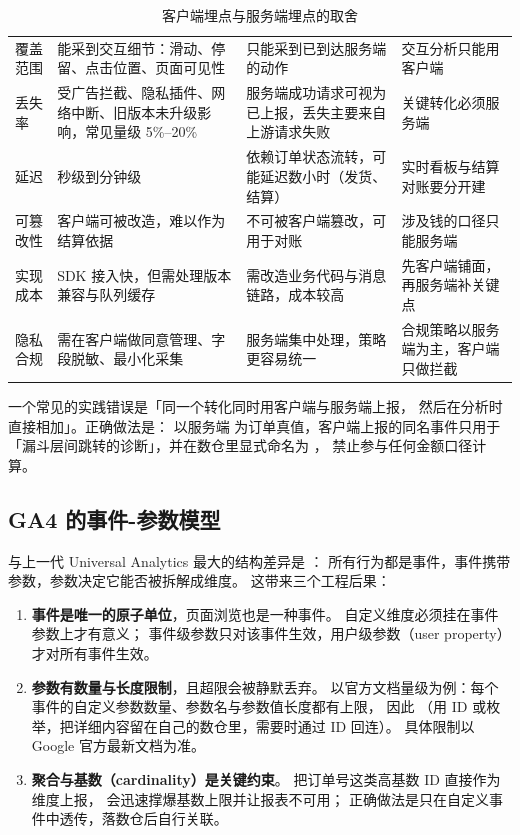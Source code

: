 \begin{table}[htbp]
\centering
\caption{客户端埋点与服务端埋点的取舍}
\label{tab:growth-client-server}
\small
\begin{tabularx}{\textwidth}{L{2.2cm} L{3.4cm} L{3.4cm} Y}
\toprule
{} &  &  &  \\
\midrule
覆盖范围 & 能采到交互细节：滑动、停留、点击位置、页面可见性 & 只能采到已到达服务端的动作 & 交互分析只能用客户端 \\
\addlinespace
丢失率 & 受广告拦截、隐私插件、网络中断、旧版本未升级影响，常见量级 5\%--20\% & 服务端成功请求可视为已上报，丢失主要来自上游请求失败 & 关键转化必须服务端 \\
\addlinespace
延迟 & 秒级到分钟级 & 依赖订单状态流转，可能延迟数小时（发货、结算） & 实时看板与结算对账要分开建 \\
\addlinespace
可篡改性 & 客户端可被改造，难以作为结算依据 & 不可被客户端篡改，可用于对账 & 涉及钱的口径只能服务端 \\
\addlinespace
实现成本 & SDK 接入快，但需处理版本兼容与队列缓存 & 需改造业务代码与消息链路，成本较高 & 先客户端铺面，再服务端补关键点 \\
\addlinespace
隐私合规 & 需在客户端做同意管理、字段脱敏、最小化采集 & 服务端集中处理，策略更容易统一 & 合规策略以服务端为主，客户端只做拦截 \\
\bottomrule
\end{tabularx}
\end{table}

一个常见的实践错误是「同一个转化同时用客户端与服务端上报，
然后在分析时直接相加」。正确做法是：
以服务端  为订单真值，客户端上报的同名事件只用于
「漏斗层间跳转的诊断」，并在数仓里显式命名为 ，
禁止参与任何金额口径计算。

\subsection{GA4 的事件-参数模型}

 与上一代 Universal Analytics 最大的结构差异是
：
所有行为都是事件，事件携带参数，参数决定它能否被拆解成维度。
这带来三个工程后果：

\begin{enumerate}
  \item \textbf{事件是唯一的原子单位}，页面浏览也是一种事件。
        自定义维度必须挂在事件参数上才有意义；
        事件级参数只对该事件生效，用户级参数（user property）才对所有事件生效。
  \item \textbf{参数有数量与长度限制}，且超限会被静默丢弃。
        以官方文档量级为例：每个事件的自定义参数数量、参数名与参数值长度都有上限，
        因此
        （用 ID 或枚举，把详细内容留在自己的数仓里，需要时通过 ID 回连）。
        具体限制以 Google 官方最新文档为准。
  \item \textbf{聚合与基数（cardinality）是关键约束}。
        把订单号这类高基数 ID 直接作为维度上报，
        会迅速撑爆基数上限并让报表不可用；
        正确做法是只在自定义事件中透传，落数仓后自行关联。
\end{enumerate}

